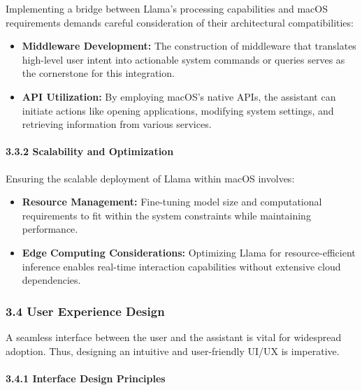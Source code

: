 Implementing a bridge between Llama's processing capabilities and macOS
requirements demands careful consideration of their architectural
compatibilities:

\begin{itemize}
\tightlist
\item
  \textbf{Middleware Development:} The construction of middleware that
  translates high-level user intent into actionable system commands or
  queries serves as the cornerstone for this integration.
\item
  \textbf{API Utilization:} By employing macOS's native APIs, the
  assistant can initiate actions like opening applications, modifying
  system settings, and retrieving information from various services.
\end{itemize}

\hypertarget{scalability-and-optimization}{%
\paragraph{3.3.2 Scalability and
Optimization}\label{scalability-and-optimization}}

Ensuring the scalable deployment of Llama within macOS involves:

\begin{itemize}
\tightlist
\item
  \textbf{Resource Management:} Fine-tuning model size and computational
  requirements to fit within the system constraints while maintaining
  performance.
\item
  \textbf{Edge Computing Considerations:} Optimizing Llama for
  resource-efficient inference enables real-time interaction
  capabilities without extensive cloud dependencies.
\end{itemize}

\hypertarget{user-experience-design}{%
\subsubsection{3.4 User Experience
Design}\label{user-experience-design}}

A seamless interface between the user and the assistant is vital for
widespread adoption. Thus, designing an intuitive and user-friendly
UI/UX is imperative.

\hypertarget{interface-design-principles}{%
\paragraph{3.4.1 Interface Design
Principles}\label{interface-design-principles}}

